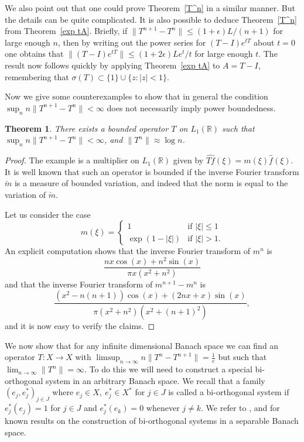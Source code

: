 \documentclass[12pt]{amsart}
\newtheorem{thm}{Theorem}[section]
\newcommand{\R}{{\mathbb R}}
\newcommand{\modo}[1]{{\left|#1\right|}}
\newcommand{\snormo}[1]{{\mathopen\|#1\mathclose\|}}
\begin{document}
We also point out that one could prove Theorem~\ref{T^n} in a similar
manner.  But the details can be quite complicated.  It is also possible
to deduce Theorem~\ref{T^n} from Theorem~\ref{exp tA}.  Briefly,
if $\snormo{T^{n+1}-T^n} \le (1+\epsilon)L/(n+1)$ for large enough $n$,
then by writing out the power series for $(T-I)e^{tT}$ about $t=0$
one obtains that
$\snormo{(T-I)e^{tT}} \le (1+2\epsilon)Le^t/t$ for large enough $t$.
The result now follows quickly by applying Theorem~\ref{exp tA} to $A = T-I$,
remembering that $\sigma(T) \subset \{1\} \cup \{z:\modo z < 1\}$.

Now we give some counterexamples to show that in general the condition
$\sup_n n\snormo{T^{n+1}-T^n} < \infty $ does not necessarily imply
power boundedness.

\begin{thm}
There exists a bounded operator $T$ on $L_1(\R)$ such that
$ \sup_n n\snormo{T^{n+1}-T^n} < \infty $,
and $\snormo{T^n} \approx \log n$.
\end{thm}

\begin{proof}
The example is a multiplier on $L_1(\R)$ given by
$\widehat{Tf}(\xi) = m(\xi) \hat f(\xi)$.
It is well known that such an operator is bounded if the inverse
Fourier transform
$\check m$ is a measure of bounded variation, and indeed that the norm
is equal to the variation of $\check m$.

Let us consider the case
$$ m(\xi) = \left\{
   \begin{array}{cl}
     1 & \text{if $\modo\xi \le 1$}\\
     \exp(1-\modo{\xi}) & \text{if $\modo\xi > 1$}.
   \end{array} \right.
$$
An explicit computation
shows that the inverse Fourier transform of $m^n$ is
$$ \frac{n x\cos(x)+n^2\sin(x)}{\pi x(x^2+n^2)} $$
and that the inverse Fourier transform of $m^{n+1}-m^n$ is
$$ \frac
   {(x^2-n(n+1))\cos(x) + (2n x+x)\sin(x)}
   {\pi (x^2+n^2)(x^2+(n+1)^2)} ,$$
and it is now easy to verify the claims.
\end{proof}

We now show that for any infinite dimensional
Banach space we can find an operator
$T:X\to X$ with $\limsup_{n\to\infty}n\|T^n-T^{n+1}\|=\frac1e$ but
such that $\lim_{n\to\infty}\|T^n\|=\infty$.  To do this we will
need to construct a special bi-orthogonal system in an arbitrary
Banach space. We recall that a family $(e_j,e_j^*)_{j\in J}$ where
$e_j\in X,\ e_j^*\in X^*$ for $j\in J$ is called a bi-orthogonal
system if $e_j^*(e_j)=1$ for $j\in J$ and $e_j^*(e_k)=0$ whenever
$j\neq k.$
 We refer to \cite{LT}, \cite{OP} and \cite{P} for known results on the construction of
 bi-orthogonal systems in a separable Banach space.
\end{document}
